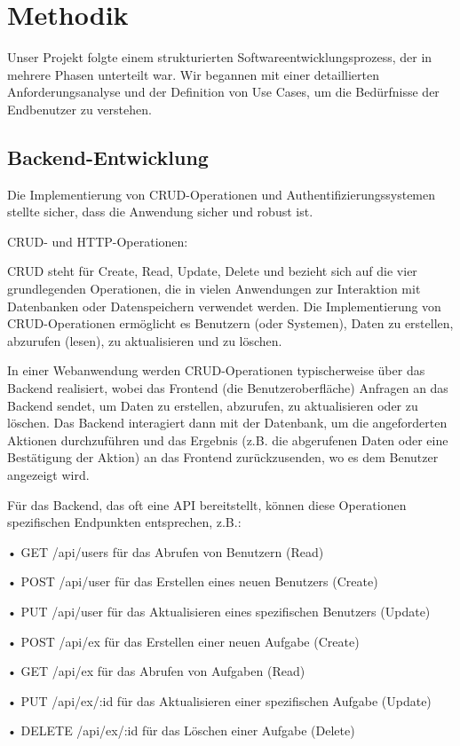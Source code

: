 
\section{Methodik}
Unser Projekt folgte einem strukturierten Softwareentwicklungsprozess, der in mehrere Phasen unterteilt war. Wir begannen mit einer detaillierten Anforderungsanalyse und der Definition von Use Cases, um die Bedürfnisse der Endbenutzer zu verstehen.

\subsection{Backend-Entwicklung}
Die Implementierung von CRUD-Operationen und Authentifizierungssystemen stellte sicher, dass die Anwendung sicher und robust ist.

CRUD- und HTTP-Operationen:

CRUD steht für Create, Read, Update, Delete und bezieht sich auf die vier grundlegenden Operationen, die in vielen Anwendungen zur Interaktion mit Datenbanken oder Datenspeichern verwendet werden. Die Implementierung von CRUD-Operationen ermöglicht es Benutzern (oder Systemen), Daten zu erstellen, abzurufen (lesen), zu aktualisieren und zu löschen.

In einer Webanwendung werden CRUD-Operationen typischerweise über das Backend realisiert, wobei das Frontend (die Benutzeroberfläche) Anfragen an das Backend sendet, um Daten zu erstellen, abzurufen, zu aktualisieren oder zu löschen. Das Backend interagiert dann mit der Datenbank, um die angeforderten Aktionen durchzuführen und das Ergebnis (z.B. die abgerufenen Daten oder eine Bestätigung der Aktion) an das Frontend zurückzusenden, wo es dem Benutzer angezeigt wird.

Für das Backend, das oft eine API bereitstellt, können diese Operationen spezifischen Endpunkten entsprechen, z.B.:

•	GET /api/users	für das Abrufen von Benutzern (Read)

•	POST /api/user	für das Erstellen eines neuen Benutzers (Create)

•	PUT /api/user	für das Aktualisieren eines spezifischen Benutzers (Update)

•	POST /api/ex	für das Erstellen einer neuen Aufgabe (Create)

•	GET /api/ex	für das Abrufen von Aufgaben (Read)

•	PUT /api/ex/:id	für das Aktualisieren einer spezifischen Aufgabe (Update)

•	DELETE /api/ex/:id 	für das Löschen einer Aufgabe (Delete)

